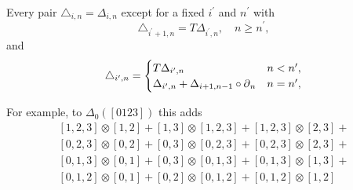 
Every pair $\triangle_{i,n} = \Delta_{i,n}$ except for a fixed $i^\prime$ and $n^\prime$ with
\[
\triangle_{i^\prime+1, n} =
T \Delta_{i^\prime, n}, \quad n \geq n^\prime,
\]
and
\[
\triangle_{i^\prime, n} = \begin{cases}
T \Delta_{i^\prime, n} & n < n^\prime, \\
\Delta_{i^\prime, n} + \Delta_{i+1, n-1} \circ \operatorname{\partial}_n & n = n^\prime,
\end{cases}
\]

For example, to $\Delta_0([0123])$ this adds
\[
\begin{split}
[1,2,3] \otimes [1,2] + [1,3] \otimes [1,2,3] + [1,2,3] \otimes [2,3] + \\ [0,2,3] \otimes [0,2] + [0,3] \otimes [0,2,3] + [0,2,3] \otimes [2,3] + \\ [0,1,3] \otimes [0,1] + [0,3] \otimes [0,1,3] + [0,1,3] \otimes [1,3] + \\ [0,1,2] \otimes [0,1] + [0,2] \otimes [0,1,2] + [0,1,2] \otimes [1,2] \phantom{+}
\end{split}
\]
